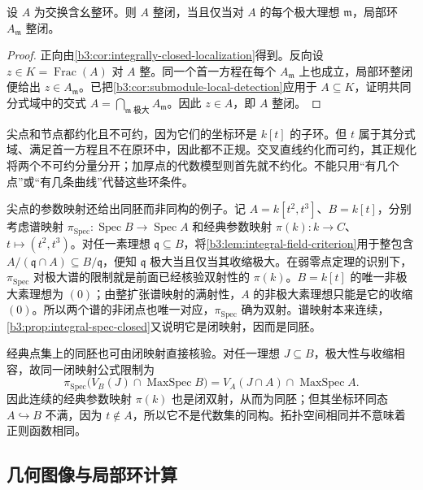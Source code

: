 \begin{proposition}\label{b3:prop:normality-local-detection}
	设 \(A\) 为交换含幺整环。则 \(A\) 整闭，当且仅当对 \(A\) 的每个极大理想 \(\mathfrak m\)，局部环 \(A_{\mathfrak m}\) 整闭。
\end{proposition}
\begin{proof}
	正向由\cref{b3:cor:integrally-closed-localization}得到。反向设 \(z\in K=\operatorname{Frac}(A)\) 对 \(A\) 整。同一个首一方程在每个 \(A_{\mathfrak m}\) 上也成立，局部环整闭便给出 \(z\in A_{\mathfrak m}\)。已把\cref{b3:cor:submodule-local-detection}应用于 \(A\subseteq K\)，证明共同分式域中的交式 \(A=\bigcap_{\mathfrak m\;\text{极大}}A_{\mathfrak m}\)。因此 \(z\in A\)，即 \(A\) 整闭。
\end{proof}

尖点和节点都约化且不可约，因为它们的坐标环是 \(k[t]\) 的子环。但 \(t\) 属于其分式域、满足首一方程且不在原环中，因此都不正规。交叉直线约化而可约，其正规化将两个不可约分量分开；加厚点的代数模型则首先就不约化。不能只用“有几个点”或“有几条曲线”代替这些环条件。

\ProseParagraphBreak
尖点的参数映射还给出同胚而非同构的例子。记 \(A=k[t^2,t^3]\)、\(B=k[t]\)，分别考虑谱映射 \(\pi_{\mathrm{Spec}}:\operatorname{Spec}B\to\operatorname{Spec}A\) 和经典参数映射 \(\pi(k):k\to C\)、\(t\mapsto(t^2,t^3)\)。对任一素理想 \(\mathfrak q\subseteq B\)，将\cref{b3:lem:integral-field-criterion}用于整包含 \(A/(\mathfrak q\cap A)\subseteq B/\mathfrak q\)，便知 \(\mathfrak q\) 极大当且仅当其收缩极大。在弱零点定理的识别下，\(\pi_{\mathrm{Spec}}\) 对极大谱的限制就是前面已经核验双射性的 \(\pi(k)\)。\(B=k[t]\) 的唯一非极大素理想为 \((0)\)；由整扩张谱映射的满射性，\(A\) 的非极大素理想只能是它的收缩 \((0)\)。所以两个谱的非闭点也唯一对应，\(\pi_{\mathrm{Spec}}\) 确为双射。谱映射本来连续，\cref{b3:prop:integral-spec-closed}又说明它是闭映射，因而是同胚。

经典点集上的同胚也可由闭映射直接核验。对任一理想 \(J\subseteq B\)，极大性与收缩相容，故同一闭映射公式限制为
\[
	\pi_{\mathrm{Spec}}\bigl(V_B(J)\cap\operatorname{MaxSpec}B\bigr) =V_A(J\cap A)\cap\operatorname{MaxSpec}A.
\]
因此连续的经典参数映射 \(\pi(k)\) 也是闭双射，从而为同胚；但其坐标环同态 \(A\hookrightarrow B\) 不满，因为 \(t\notin A\)，所以它不是代数集的同构。拓扑空间相同并不意味着正则函数相同。

\subsection{几何图像与局部环计算}
\label{b3:subsec:0704:03}

